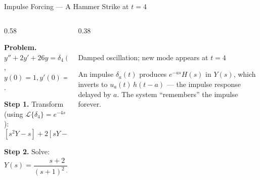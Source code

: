 \documentclass[aspectratio=169,11pt]{beamer}
\begin{document}
\begin{frame}{Impulse Forcing --- A Hammer Strike at $t=4$}
\footnotesize
\begin{columns}[T]
\begin{column}{0.58\textwidth}
\begin{examplebox}[Damped Oscillator Struck at $t=4$]
\textbf{Problem.} $y'' + 2y' + 26y = \delta_4(t)$, $y(0)=1, y'(0)=0$.

\textbf{Step 1.} Transform (using $\mathcal{L}\{\delta_4\} = e^{-4s}$):
\[[s^2Y - s] + 2[sY - 2] + 26Y = e^{-4s}\]

\textbf{Step 2.} Solve:
\[Y(s) = \frac{s+2}{(s+1)^2+25} + \frac{e^{-4s}}{(s+1)^2+25}\]
\end{examplebox}
\end{column}
\begin{column}{0.38\textwidth}
\centering
{}\\[1mm]
{\footnotesize\color{headerblue}Damped oscillation; new mode appears at $t=4$}
\vspace{1mm}
\begin{conceptbox}
An impulse $\delta_a(t)$ produces $e^{-as}H(s)$ in $Y(s)$, which inverts to $u_a(t)\,h(t-a)$ --- the impulse response delayed by $a$. The system ``remembers'' the impulse forever.
\end{conceptbox}
\end{column}
\end{columns}
\end{frame}
\end{document}
